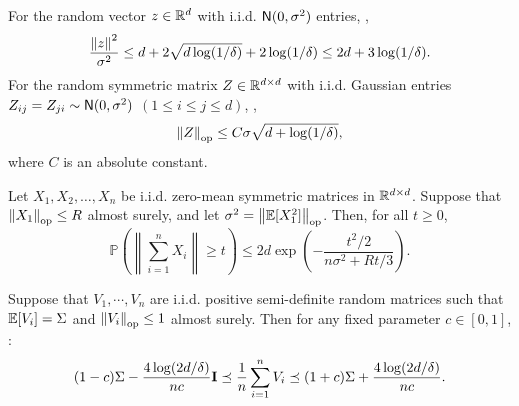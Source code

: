 


\begin{lemma}\label{lem:Gaussian-concen}
For the random vector $z\in\mathbb{R}^d$ with i.i.d. $\mathsf{N}(0,\sigma^2)$ entries, \whp, 
\begin{align*}
    \frac{\left\|z\right\|^2}{\sigma^2}\leq d+2\sqrt{d\log(1/\delta)}+2\log(1/\delta)\leq 2d+3\log(1/\delta).
\end{align*}
For the random symmetric matrix $Z\in\mathbb{R}^{d\times d}$ with i.i.d. Gaussian entries $Z_{ij}=Z_{ji}\sim \mathsf{N}(0,\sigma^2)$ $(1\leq i\leq j\leq d)$, \whp,
\begin{align*}
    \left\|Z\right\|_{\rm op}\leq C\sigma\sqrt{d+\log(1/\delta)},
\end{align*}
where $C$ is an absolute constant.
\end{lemma}

\begin{lemma}\label{lem:Bernstein}
Let $X_1, X_2, \dots, X_n$ be i.i.d. zero-mean symmetric matrices in $\mathbb{R}^{d\times d}$. Suppose that $\left\|X_1\right\|_{\rm op} \leq R$ almost surely, and let $\sigma^2 = \left\|\mathbb{E}[X_1^2]\right\|_{\rm op}$.
Then, for all \( t \geq 0 \),
\[
\mathbb{P} \left( \left\| \sum_{i=1}^n X_i \right\| \geq t \right) \leq 2d \exp \left( - \frac{t^2 / 2}{n\sigma^2 + Rt/3} \right).
\]
\end{lemma}

\begin{lemma}\label{lem:cov-concen}
Suppose that $V_1,\cdots,V_n$ are i.i.d. positive semi-definite random matrices such that $\mathbb{E}[V_i]=\Sigma$ and $\left\|V_i\right\|_{\rm op}\leq 1$ almost surely. Then for any fixed parameter $c\in[0,1]$, \whp:
\begin{align*}
    (1-c)\Sigma-\frac{4\log(2d/\delta)}{nc}\mathbf{I} \preceq \frac1n\sum_{i=1}^n V_i\preceq (1+c)\Sigma+\frac{4\log(2d/\delta)}{nc}.
\end{align*}
\end{lemma}

